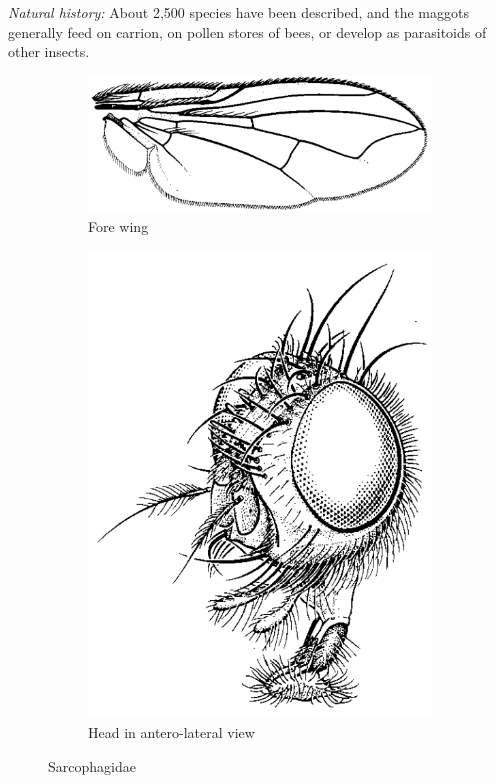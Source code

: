 \documentclass[letterpaper, 11pt]{article}
\begin{document}
\noindent{}\textit{Natural history:} About 2,500 species have been described, and the maggots generally feed on carrion, on pollen stores of bees, or develop as parasitoids of other insects. 

\begin{figure}[ht!]
    \centering
    \begin{subfigure}[ht!]{0.5\textwidth}
        \includegraphics[width=\textwidth]{SarcophagidWing}
        \caption{Fore wing \citep[][Fig. 116.30]{mcalpine1981manualv2}}
        \label{fig:sarcoph1}
    \end{subfigure}
    \qquad
    \begin{subfigure}[ht!]{0.25\textwidth}
        \includegraphics[width=\textwidth]{SarcophagidHead}
        \caption{Head in antero-lateral view \citep[][Fig. 116.13]{mcalpine1981manualv2}}
        \label{fig:sarcoph2}
    \end{subfigure}
    \caption{Sarcophagidae}\label{fig:sarcophs}
\end{figure}
\end{document}
